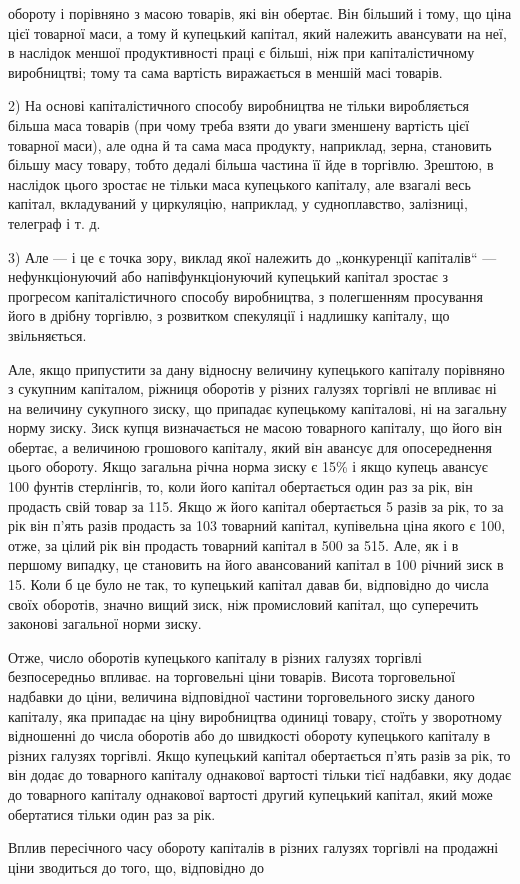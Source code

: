 \parcont{}  %
обороту і порівняно з масою товарів, які він обертає. Він більший і
тому, що ціна цієї товарної маси, а тому й купецький капітал,
який належить авансувати на неї, в наслідок меншої продуктивності
праці є більші, ніж при капіталістичному виробництві;
тому та сама вартість виражається в меншій масі товарів.

2) На основі капіталістичного способу виробництва не тільки
виробляється більша маса товарів (при чому треба взяти до
уваги зменшену вартість цієї товарної маси), але одна й та сама
маса продукту, наприклад, зерна, становить більшу масу товару,
тобто дедалі більша частина її йде в торгівлю. Зрештою, в наслідок
цього зростає не тільки маса купецького капіталу, але
взагалі весь капітал, вкладуваний у циркуляцію, наприклад, у
судноплавство, залізниці, телеграф і т. д.

3) Але — і це є точка зору, виклад якої належить до „конкуренції
капіталів“ — нефункціонуючий або напівфункціонуючий
купецький капітал зростає з прогресом капіталістичного способу
виробництва, з полегшенням просування його в дрібну торгівлю,
з розвитком спекуляції і надлишку капіталу, що звільняється.

Але, якщо припустити за дану відносну величину купецького
капіталу порівняно з сукупним капіталом, ріжниця оборотів
у різних галузях торгівлі не впливає ні на величину сукупного
зиску, що припадає купецькому капіталові, ні на загальну норму
зиску. Зиск купця визначається не масою товарного капіталу,
що його він обертає, а величиною грошового капіталу, який він
авансує для опосереднення цього обороту. Якщо загальна річна
норма зиску є 15\% і якщо купець авансує 100 фунтів стерлінгів,
то, коли його капітал обертається один раз за рік, він продасть
свій товар за 115. Якщо ж його капітал обертається 5 разів за
рік, то за рік він п’ять разів продасть за 103 товарний капітал,
купівельна ціна якого є 100, отже, за цілий рік він продасть
товарний капітал в 500 за 515. Але, як і в першому випадку, це
становить на його авансований капітал в 100 річний зиск в 15.
Коли б це було не так, то купецький капітал давав би, відповідно
до числа своїх оборотів, значно вищий зиск, ніж промисловий
капітал, що суперечить законові загальної норми зиску.

Отже, число оборотів купецького капіталу в різних галузях
торгівлі безпосередньо впливає. на торговельні ціни товарів. Висота
торговельної надбавки до ціни, величина відповідної частини
торговельного зиску даного капіталу, яка припадає на ціну
виробництва одиниці товару, стоїть у зворотному відношенні
до числа оборотів або до швидкості обороту купецького
капіталу в різних галузях торгівлі. Якщо купецький капітал
обертається п’ять разів за рік, то він додає до товарного капіталу
однакової вартості тільки  тієї надбавки, яку додає до товарного
капіталу однакової вартості другий купецький капітал, який може
обертатися тільки один раз за рік.

Вплив пересічного часу обороту капіталів в різних галузях
торгівлі на продажні ціни зводиться до того, що, відповідно до
\parbreak{}  %
